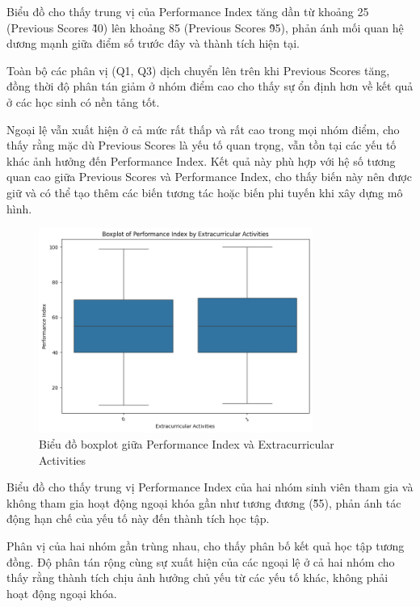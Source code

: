 Biểu đồ cho thấy trung vị của Performance Index tăng dần từ khoảng 25 (Previous Scores \~ 40) lên khoảng 85 (Previous Scores \~ 95), phản ánh mối quan hệ dương mạnh giữa điểm số trước đây và thành tích hiện tại.

Toàn bộ các phân vị (Q1, Q3) dịch chuyển lên trên khi Previous Scores tăng, đồng thời độ phân tán giảm ở nhóm điểm cao cho thấy sự ổn định hơn về kết quả ở các học sinh có nền tảng tốt.

Ngoại lệ vẫn xuất hiện ở cả mức rất thấp và rất cao trong mọi nhóm điểm, cho thấy rằng mặc dù Previous Scores là yếu tố quan trọng, vẫn tồn tại các yếu tố khác ảnh hưởng đến Performance Index. Kết quả này phù hợp với hệ số tương quan cao giữa Previous Scores và Performance Index, cho thấy biến này nên được giữ và có thể tạo thêm các biến tương tác hoặc biến phi tuyến khi xây dựng mô hình.

\begin{figure}[H]
	\centering
	\includegraphics[width=0.8\textwidth]{images/eda/5.png}
	\caption{Biểu đồ boxplot giữa Performance Index và Extracurricular Activities}
\end{figure}

Biểu đồ cho thấy trung vị Performance Index của hai nhóm sinh viên tham gia và không tham gia hoạt động ngoại khóa gần như tương đương (\~55), phản ánh tác động hạn chế của yếu tố này đến thành tích học tập.

Phân vị của hai nhóm gần trùng nhau, cho thấy phân bố kết quả học tập tương đồng. Độ phân tán rộng cùng sự xuất hiện của các ngoại lệ ở cả hai nhóm cho thấy rằng thành tích chịu ảnh hưởng chủ yếu từ các yếu tố khác, không phải hoạt động ngoại khóa.

